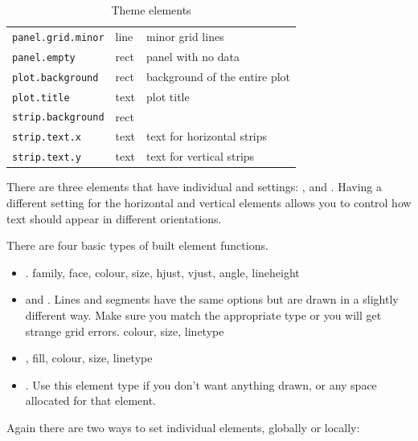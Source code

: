 \begin{table}
\begin{center}
\begin{tabular}{lll}
    \texttt{panel.grid.minor}  & line     & minor grid lines \\[0.5em]
    \texttt{panel.empty}       & rect     & panel with no data   \\
    \texttt{plot.background}   & rect     & background of the entire plot \\
    \texttt{plot.title}        & text     & plot title   \\[0.5em]
    \texttt{strip.background}  & rect     &   \\
    \texttt{strip.text.x}      & text     & text for horizontal strips  \\
    \texttt{strip.text.y}      & text     & text for vertical strips  \\
    \bottomrule                           
  
  \end{tabular}
  \end{center}
  \caption{Theme elements}
  \label{tbl:elements}
\end{table}

There are three elements that have individual  and  settings: ,  and .  Having a different setting for the horizontal and vertical elements allows you to control how text should appear in different orientations.

There are four basic types of built element functions.

\begin{itemize}
  \item {}. family, face, colour, size, hjust, vjust, angle, lineheight

  \item {} and .  Lines and segments have the same options but are drawn in a slightly different way.  Make sure you match the appropriate type or you will get strange grid errors.  colour, size, linetype

  \item {}, fill, colour, size, linetype

  \item {}.  Use this element type if you don't want anything drawn, or any space allocated for that element.  

\end{itemize}

Again there are two ways to set individual elements, globally or locally:

